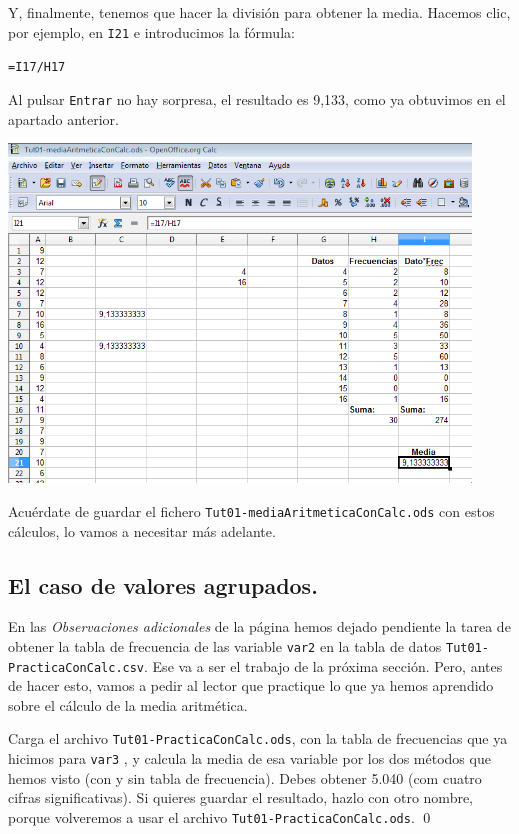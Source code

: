 \documentclass[10pt,a4paper]{article}\usepackage[]{graphicx}\usepackage[]{color}
\begin{document}
Y, finalmente, tenemos que hacer la división para obtener la media. Hacemos clic, por ejemplo, en {\tt I21} e introducimos la fórmula:
\begin{center}
{\tt =I17/H17}
\end{center}
 Al pulsar {\tt Entrar} no hay sorpresa, el resultado es 9,133, como ya obtuvimos en el apartado anterior.
    \begin{center}
    \includegraphics[height=9cm]{../fig/Tut02-27.png}
    \end{center}
Acuérdate de guardar el fichero {\tt Tut01-mediaAritmeticaConCalc.ods} con estos cálculos, lo vamos a necesitar más adelante.


\subsection{El caso de valores agrupados.}
\label{tut02:subsec:mediaAritmeticaDatosAgrupados}

En las {\em Observaciones adicionales} de la  página \pageref{tut01:subsubsec:ObservacionesAdicionalesTablasFrecuenciaSencillas} hemos dejado pendiente la tarea de obtener la tabla de frecuencia de las variable {\tt var2} en la tabla de datos {\tt Tut01-PracticaConCalc.csv}. Ese va a ser el trabajo de la próxima sección. Pero, antes de hacer esto, vamos a pedir al lector que practique lo que ya hemos aprendido sobre el cálculo de la media aritmética.

\begin{ejercicio}
\quad
Carga el archivo {\tt Tut01-PracticaConCalc.ods}, con la tabla de frecuencias que ya hicimos para {\tt var3}
, y calcula la media de esa variable por los dos métodos que hemos visto (con y sin tabla de frecuencia). Debes obtener 5.040 (com cuatro cifras significativas). Si quieres guardar el resultado, hazlo con otro nombre, porque volveremos a usar el archivo {\tt Tut01-PracticaConCalc.ods}.
\qed
\end{ejercicio}
\end{document}

